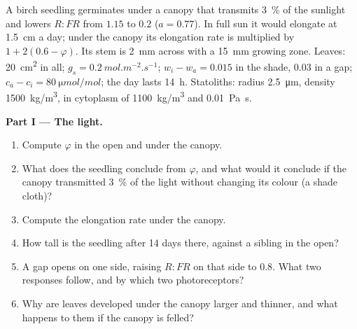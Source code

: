 \begin{problem}
\label{pb:b2:plant-plasticity:1}
A birch seedling germinates under a canopy that transmits
\qty{3}{\%} of the sunlight and lowers $R{:}FR$ from $1.15$ to $0.2$
($a = 0.77$). In full sun it would elongate at \qty{1.5}{cm} a day;
under the canopy its elongation rate is multiplied by $1 +
2(0.6 - \varphi)$. Its stem is \qty{2}{mm} across with a
\qty{15}{mm} growing zone. Leaves: \qty{20}{cm^2} in all; $g_s =
\qty{0.2}{mol.m^{-2}.s^{-1}}$; $w_i - w_a = 0.015$ in the shade,
$0.03$ in a gap; $c_a - c_i = \qty{80}{\micro mol/mol}$; the day
lasts \qty{14}{h}. Statoliths: radius \qty{2.5}{\micro m}, density
\qty{1500}{kg/m^3}, in cytoplasm of \qty{1100}{kg/m^3} and
\qty{0.01}{Pa.s}.

\medskip
\noindent\textbf{Part I --- The light.}
\begin{enumerate}
  \item Compute $\varphi$ in the open and under the canopy.
  \item What does the seedling conclude from $\varphi$, and what
        would it conclude if the canopy transmitted \qty{3}{\%} of
        the light without changing its colour (a shade cloth)?
  \item Compute the elongation rate under the canopy.
  \item How tall is the seedling after 14 days there, against a
        sibling in the open?
  \item A gap opens on one side, raising $R{:}FR$ on that side to
        $0.8$. What two responses follow, and by which two
        photoreceptors?
  \item Why are leaves developed under the canopy larger and
        thinner, and what happens to them if the canopy is felled?
\end{enumerate}


\end{problem}
